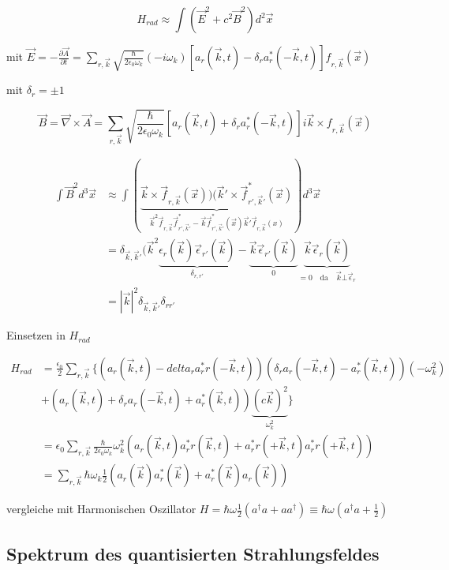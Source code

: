 \[ H_{rad} \approx \int (\vec E ^2 + c^2\vec B^2)d^2\vec x \]

mit \(\vec E = -\frac{\partial \vec A}{\partial t} = \sum_{r,\vec k}\sqrt{\frac{\hbar}{2\epsilon_0\omega_k}}(-i\omega_k)\left[a_r(\vec k,t)  - \delta_r a^*_r(-\vec k,t) \right]f_{r,\vec k}(\vec x)\)

mit \(\delta_r=\pm 1\)

\[\vec B = \vec \nabla\times\vec A = \sum_{r,\vec k}\sqrt{\frac{\hbar}{2\epsilon_0\omega_k}} \left[a_r(\vec k,t)  + \delta_r a^*_r(-\vec k,t) \right]i\vec k\times f_{r,\vec k}(\vec x)   \]


\begin{align}
\int \vec B^2 d^3\vec x &\approx \int(\underbrace{\vec k\times\vec f_{r,\vec k}(\vec x))(\vec k'\times \vec f^*_{r',\vec k'}(\vec x)}_{\vec k^2\vec f_{r,\vec k}\vec f^*_{r',\vec k'}-\vec k\vec f^*_{r',\vec k'}(\vec x)\vec k'\vec f_{r,\vec k}(x)})d^3\vec x\\
&= \delta_{\vec k,\vec k'}(\vec k^2\underbrace{\epsilon_r(\vec k)\vec \epsilon_{r'}(\vec k)  }_{\delta_{r,r'}}- \underbrace{\vec k\vec\epsilon_{r'}(\vec k)}_{0}\underbrace{\vec k\vec \epsilon_r(\vec k)}_{=0 \quad \text{da}\quad \vec k\bot\vec\epsilon_r}\\
&= |\vec k|^2\delta_{\vec k,\vec k'}\delta_{rr'}
\end{align}



Einsetzen in \(H_{rad}\)

\begin{align}
H_{rad} &= \frac{\epsilon_0}{2}\sum_{r,\vec k}\{ (a_r(\vec k,t) -delta_r a^*_rr(-\vec k,t))(\delta_r a_r(-\vec k,t)-a^*_r(\vec k,t))(-\omega^2_k)\\
&+(a_r(\vec k,t)+\delta_r a_r(-\vec k,t) + a^*_r(\vec k,t) )\underbrace{(c\vec k)^2}_{\omega^2_k}    \}  \\
&=\epsilon_0 \sum_{r,\vec k} \frac{\hbar}{2\epsilon_0\omega_k} \omega_k^2 (a_r(\vec k,t)a^*_rr(\vec k,t)+a^*_rr(+\vec k,t)a^*_rr(+\vec k,t))\\
&= \sum_{r,\vec k} \hbar\omega_k \frac{1}{2}(a_r(\vec k)a^*_r(\vec k) + a^*_r(\vec k)a_r(\vec k))
\end{align}

vergleiche mit Harmonischen Oszillator \(H = \hbar\omega \frac{1}{2}(a^\dagger a+ aa^\dagger)\equiv \hbar\omega(a^\dagger a+\frac{1}{2})\)



\subsection{Spektrum des quantisierten Strahlungsfeldes}

